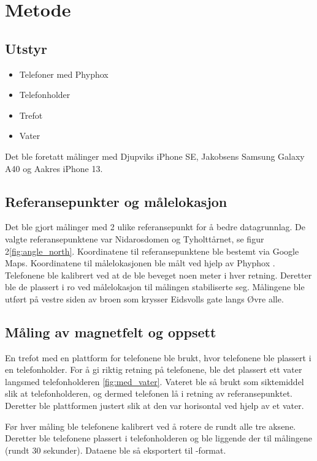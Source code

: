 \section{Metode}
\subsection{Utstyr}
\begin{itemize}
    \item Telefoner med Phyphox
    \item Telefonholder
    \item Trefot
    \item Vater
\end{itemize}
Det ble foretatt målinger med Djupviks iPhone SE, Jakobsens Samsung Galaxy A40 og Aakres iPhone 13. 

\subsection{Referansepunkter og målelokasjon}
Det ble gjort målinger med 2 ulike referansepunkt for å bedre datagrunnlag. De valgte referansepunktene var Nidarosdomen og Tyholttårnet, se figur 2\ref{fig:angle_north}. Koordinatene til referansepunktene ble bestemt via Google Maps. Koordinatene til målelokasjonen ble målt ved hjelp av Phyphox \cite{phyphox}. Telefonene ble kalibrert ved at de ble beveget noen meter i hver retning. Deretter ble de plassert i ro ved målelokasjon til målingen stabiliserte seg. Målingene ble utført på vestre siden av broen som krysser Eidsvolls gate langs Øvre alle. 


\subsection{Måling av magnetfelt og oppsett}
En trefot med en plattform for telefonene ble brukt, hvor telefonene ble plassert i en telefonholder. For å gi riktig retning på telefonene, ble det plassert ett vater langsmed telefonholderen \ref{fig:med_vater}. Vateret ble så brukt som siktemiddel slik at telefonholderen, og dermed telefonen lå i retning av referansepunktet. Deretter ble plattformen justert slik at den var horisontal ved hjelp av et vater.

Før hver måling ble telefonene kalibrert ved å rotere de rundt alle tre aksene. Deretter ble telefonene plassert i telefonholderen og ble liggende der til målingene (rundt $30$ sekunder). Dataene ble så eksportert til -format. 

